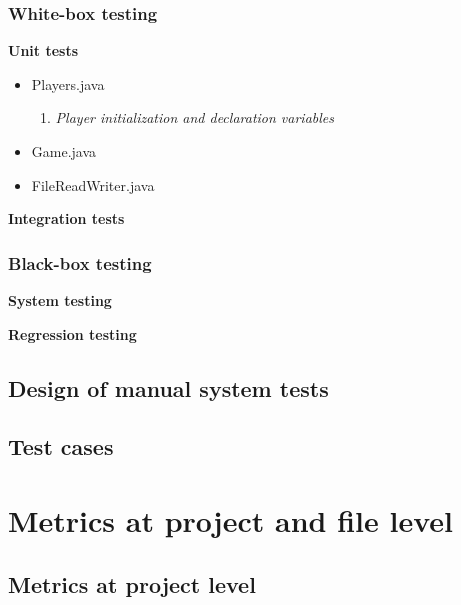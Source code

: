 \documentclass{article}
\begin{document}
\subsubsection{White-box testing}
\textbf{Unit tests}%
\begin{itemize}
\item Players.java
\begin{enumerate}
\item
\textit{Player initialization and declaration variables}
\end{enumerate}


\item Game.java
\item FileReadWriter.java

\end{itemize}
\textbf{Integration tests}



\subsubsection{Black-box testing}
\textbf{System testing\newline}


\textbf{Regression testing}%

\subsection{Design of manual system tests}


\subsection{Test cases}


\section{Metrics at project and file level}

\subsection{Metrics at project level}
\end{document}
